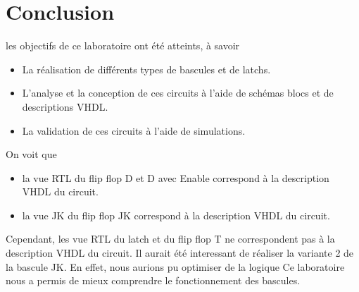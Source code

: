 \section{Conclusion}
les objectifs de ce laboratoire ont été atteints, à savoir 
\begin{itemize}
    \item La réalisation de différents types de bascules et de latchs.
    \item L'analyse et la conception de ces circuits à l'aide de schémas blocs et de descriptions VHDL.
    \item La validation de ces circuits à l'aide de simulations.
\end{itemize}
On voit que 
\begin{itemize}
    \item la vue RTL du flip flop D et D avec Enable correspond à la description VHDL du circuit.
    \item la vue JK du flip flop JK correspond à la description VHDL du circuit.
\end{itemize}
Cependant, les vue RTL du latch et du flip flop T ne correspondent pas à la description VHDL du circuit.
Il aurait été interessant de réaliser la variante 2 de la bascule JK. En effet, nous aurions pu optimiser de la logique 
Ce laboratoire nous a permis de mieux comprendre le fonctionnement des bascules.
